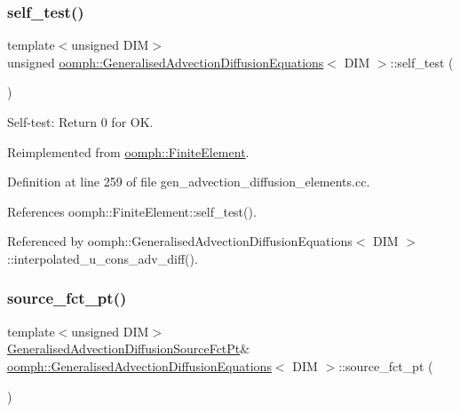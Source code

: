 \subsubsection{\texorpdfstring{self\+\_\+test()}{self\_test()}}
{\footnotesize\ttfamily template$<$unsigned D\+IM$>$ \\
unsigned \hyperlink{classoomph_1_1GeneralisedAdvectionDiffusionEquations}{oomph\+::\+Generalised\+Advection\+Diffusion\+Equations}$<$ D\+IM $>$\+::self\+\_\+test (\begin{DoxyParamCaption}{ }\end{DoxyParamCaption})\hspace{0.3cm}{\ttfamily [virtual]}}



Self-\/test\+: Return 0 for OK. 



Reimplemented from \hyperlink{classoomph_1_1FiniteElement_af94c5a5e22175d5420b33b3b79e46ed3}{oomph\+::\+Finite\+Element}.



Definition at line 259 of file gen\+\_\+advection\+\_\+diffusion\+\_\+elements.\+cc.



References oomph\+::\+Finite\+Element\+::self\+\_\+test().



Referenced by oomph\+::\+Generalised\+Advection\+Diffusion\+Equations$<$ D\+I\+M $>$\+::interpolated\+\_\+u\+\_\+cons\+\_\+adv\+\_\+diff().

\mbox{\label{classoomph_1_1GeneralisedAdvectionDiffusionEquations_aa25d13de883e0ee197b050eb6e1c22b0}} 
\subsubsection{\texorpdfstring{source\+\_\+fct\+\_\+pt()}{source\_fct\_pt()}\hspace{0.1cm}{\footnotesize\ttfamily [1/2]}}
{\footnotesize\ttfamily template$<$unsigned D\+IM$>$ \\
\hyperlink{classoomph_1_1GeneralisedAdvectionDiffusionEquations_ad65d34bc0348f8b297c185d1772eafd9}{Generalised\+Advection\+Diffusion\+Source\+Fct\+Pt}\& \hyperlink{classoomph_1_1GeneralisedAdvectionDiffusionEquations}{oomph\+::\+Generalised\+Advection\+Diffusion\+Equations}$<$ D\+IM $>$\+::source\+\_\+fct\+\_\+pt (\begin{DoxyParamCaption}{ }\end{DoxyParamCaption})\hspace{0.3cm}{\ttfamily [inline]}}



